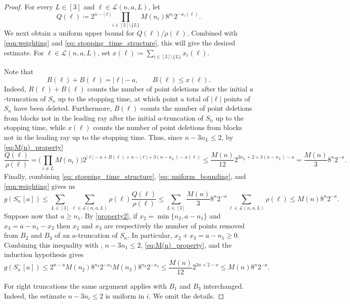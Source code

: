 \documentclass[11pt]{amsart}
\theoremstyle{definition}
\begin{document}
\begin{proof}
    For every $L\in [3]$ and $\ell \in \mathcal{L}(n,a,L)$, let 
    \begin{equation*}
        Q(\ell) \coloneqq 2^{n-|\ell|} \prod_{i\in [3]\setminus \{L\}} M(n_i)8^{n_i}2^{-x_i(\ell)}.
    \end{equation*}
    We next obtain a uniform upper bound for $Q(\ell)/\rho(\ell)$. Combined with \eqref{eqn:weighting} and \eqref{eq: stopping_time_structure}, this will give the desired estimate. For $\ell\in\mathcal L(n,a,L)$, set $x(\ell)\coloneqq \sum_{i\in[3]\setminus\{L\}} x_i(\ell)$.

    Note that 
    \begin{equation*}
        R(\ell) + B(\ell) = |\ell|-a,\qquad B(\ell)\le x(\ell).
    \end{equation*}
    Indeed, $R(\ell) + B(\ell)$ counts the number of point deletions after the initial $a$-truncation of $S_n$ up to the stopping time, at which point a total of $|\ell|$ points of $S_n$ have been deleted. Furthermore, 
    $B(\ell)$ counts the number of point deletions from blocks not in the leading ray after the initial $a$-truncation of $S_n$ up to the stopping time, while $x(\ell)$ counts the number of point deletions from blocks not in the leading ray up to the 
    stopping time. Thus, since $n-3n_L \le 2$, by \eqref{eq:M(n)_property} 
    \begin{equation}\label{eq: uniform_bounding}
         \frac{Q(\ell)}{\rho(\ell)}= \bigg(\prod_{i\ne L} M(n_i) \bigg)2^{|\ell|-a+B(\ell) + n - |\ell| +3(n-n_L) - x(\ell)}
         \le \frac{M(n)}{12}2^{3n_L+2 + 3(n-n_L)-a} = \frac{M(n)}{3}8^n2^{-a}. 
    \end{equation}
    Finally, combining \eqref{eq: stopping_time_structure}, \eqref{eq: uniform_bounding}, and \eqref{eqn:weighting} gives us
    \begin{equation*}
        g(S_n^-[a]) \le \sum_{L \in [3]} \sum_{\ell \in \mathcal{L}(n,a,L)} \rho(\ell) \frac{Q(\ell)}{\rho(\ell)} \le \sum_{L \in [3]} \frac{M(n)}{3}8^n2^{-a}\sum_{\ell \in \mathcal{L}(n,a,L)}\rho(\ell) \le  M(n)8^n2^{-a}.
    \end{equation*}
    Suppose now that $a \ge n_1$. By \cref{property2}, if $x_2 = \min\{n_2,a-n_1\}$ and $x_3 = a-n_1-x_2$ then $x_2$ and $x_3$ are respectively the number of points removed from $B_2$ and $B_3$ of an
    $a$-truncation of $S_n$. In particular, $x_2+x_3 = a-n_1 \ge 0$. Combining this inequality with , $n-3n_1\le 2$, \eqref{eq:M(n)_property}, and the 
    induction hypothesis
    gives 
    \begin{equation*}
        g(S_n^-[a]) \le 2^{n-a} M(n_2)8^{n_2}2^{-x_2}M(n_3)8^{n_3}2^{-x_3} \le \frac{M(n)}{12} 2^{3n +2-a} \le M(n)8^n2^{-a}.
    \end{equation*}



For right truncations the same argument applies with $B_1$ and $B_3$ interchanged. Indeed, the estimate $n-3n_i\le 2$ is uniform in $i$. We omit the details.
\end{proof}
\end{document}
